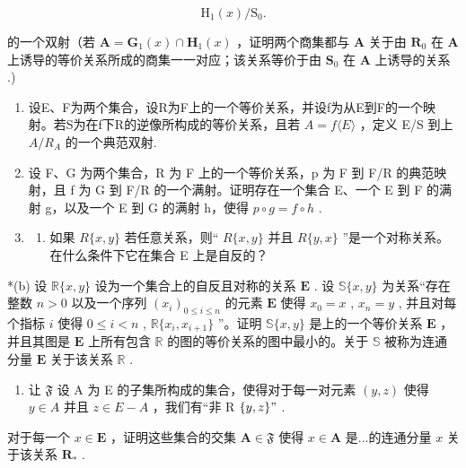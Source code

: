 \[
\mathrm{H} _ {1} (x) / \mathrm{S} _ {0}.
\]

的一个双射（若 \(\mathbf{A} = \mathbf{G}_1(x) \cap \mathbf{H}_1(x)\) ，证明两个商集都与 \(\mathbf{A}\) 关于由 \(\mathbf{R}_0\) 在 \(\mathbf{A}\) 上诱导的等价关系所成的商集一一对应；该关系等价于由 \(\mathbf{S}_0\) 在 \(\mathbf{A}\) 上诱导的关系 .)

\begin{enumerate}
\def\labelenumi{\arabic{enumi}.}
\setcounter{enumi}{7}
\item
  设E、F为两个集合，设R为F上的一个等价关系，并设f为从E到F的一个映射。若S为在f下R的逆像所构成的等价关系，且若 \(A = f \langle E \rangle\) ，定义 E/S 到上 \(A/R_{A}\) 的一个典范双射.
\item
  设 F、G 为两个集合，R 为 F 上的一个等价关系，p 为 F 到 F/R 的典范映射，且 f 为 G 到 F/R 的一个满射。证明存在一个集合 E、一个 E 到 F 的满射 g，以及一个 E 到 G 的满射 h，使得 \(p \circ g = f \circ h\) .
\item
  \begin{enumerate}
  \def\labelenumii{(\alph{enumii})}
  \tightlist
  \item
    如果 \(R\{x, y\}\) 若任意关系，则“ \(R\{x, y\}\) 并且 \(R\{y, x\}\) ”是一个对称关系。在什么条件下它在集合 E 上是自反的？
  \end{enumerate}
\end{enumerate}

*(b) 设 \(\mathbb{R}\{x, y\}\) 设为一个集合上的自反且对称的关系 \(\mathbf{E}\) . 设 \(\mathbb{S}\{x, y\}\) 为关系“存在整数 \(n > 0\) 以及一个序列 \((x_i)_{0 \leqslant i \leqslant n}\) 的元素 \(\mathbf{E}\) 使得 \(x_0 = x\) , \(x_n = y\) , 并且对每个指标 \(i\) 使得 \(0 \leqslant i < n\) , \(\mathbb{R}\{x_i, x_{i+1}\}\) ”。证明 \(\mathbb{S}\{x, y\}\) 是上的一个等价关系 \(\mathbf{E}\) ，并且其图是 \(\mathbf{E}\) 上所有包含 \(\mathbb{R}\) 的图的等价关系的图中最小的。关于 \(\mathbb{S}\) 被称为连通分量 \(\mathbf{E}\) 关于该关系 \(\mathbb{R}\) .

\begin{enumerate}
\def\labelenumi{(\alph{enumi})}
\setcounter{enumi}{2}
\tightlist
\item
  让 \(\mathfrak{F}\) 设 A 为 E 的子集所构成的集合，使得对于每一对元素 \((y,z)\) 使得 \(y\in A\) 并且 \(z\in E - A\) ，我们有“非 R \(\{y,z\} "\) .
\end{enumerate}

对于每一个 \(x \in \mathbf{E}\) ，证明这些集合的交集 \(\mathbf{A} \in \mathfrak{F}\) 使得 \(x \in \mathbf{A}\) 是...的连通分量 \(x\) 关于该关系 \(\mathbf{R}_{*}\) .

